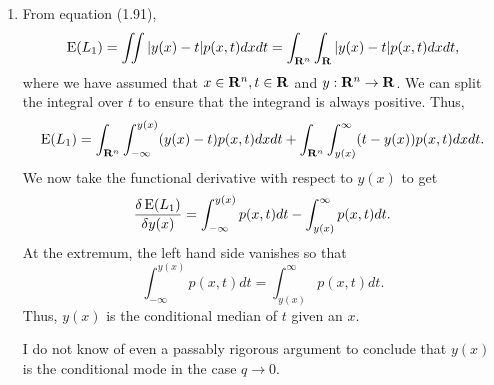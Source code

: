 \begin{enumerate}
\item From equation (1.91),
\[
\operatorname{E}(L_1) = \iint |y(x) - t|p(x, t)dxdt = \int_{\mathbf{R}^n}\int_{\mathbf{R}}|y(x) - t|p(x,t)dxdt,
\]
where we have assumed that $x \in \mathbf{R}^n, t \in \mathbf{R}$ and $y: \mathbf{R}^n \to \mathbf{R}$. We can split
the integral over $t$ to ensure that the integrand is always positive. Thus,
\[
\operatorname{E}(L_1) = \int_{\mathbf{R}^n}\int_{-\infty}^{y(x)} (y(x) - t)p(x, t)dxdt + \int_{\mathbf{R}^n}\int_{y(x)}^{\infty}(t - y(x))p(x, t)dxdt.
\]
We now take the functional derivative with respect to $y(x)$ to get
\[
\frac{\delta\operatorname{E}(L_1)}{\delta y(x)} = \int_{-\infty}^{y(x)}p(x,t)dt - \int_{y(x)}^{\infty}p(x, t)dt.
\]
At the extremum, the left hand side vanishes so that
\[
\int_{-\infty}^{y(x)}p(x,t)dt = \int_{y(x)}^{\infty}p(x, t)dt.
\]
Thus, $y(x)$ is the conditional median of $t$ given an $x$.

I do not know of even a passably rigorous argument to conclude that $y(x)$ is the conditional 
mode in the case $q \to 0$.
\end{enumerate}

